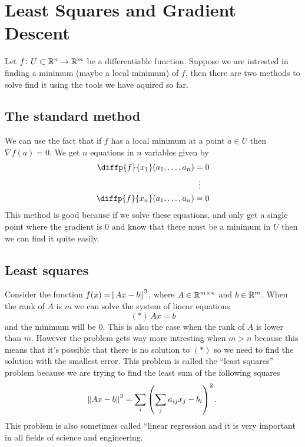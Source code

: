 \documentclass[11pt,a4paper]{article}
\begin{document}
\newpage

\section{Least Squares and Gradient Descent}
Let $f \colon U \subset \mathbb{R}^n \to \mathbb{R}^m$ be a differentiable function.
Suppose we are intrested in finding a minimum (maybe a local minimum) of $f$,
then there are two methods to solve find it using the tools we have aquired
so far.

\subsection{The standard method}
We can use the fact that if $f$ has a local minimum at a point $a \in U$ then
$\nabla f(a) = 0$.
We get $n$ equations in $n$ variables given by
\begin{align*}
  \diffp{f}{{x_1}}(a_1,\dots,a_n) &= 0 \\
                                  &\vdotswithin{=} \\
  \diffp{f}{{x_n}}(a_1,\dots,a_n) &= 0
\end{align*}
This method is good because if we solve these equations, and only get a single
point where the gradient is $0$ and know that there must be a minimum in $U$
then we can find it quite easily.

\subsection{Least squares}
Consider the function $f(x) = \norm{Ax - b}^2$, where $A \in \mathbb{R}^{m \times n}$
and $b \in \mathbb{R}^m$.
When the rank of $A$ is $m$ we can solve the system of linear equations
\[
  (*)\,Ax = b
\]
and the minimum will be $0$.
This is also the case when the rank of $A$ is lower than $m$.
However the problem gets way more intresting when $m > n$ because this means
that it's possible that there is no solution to $(*)$ so we need to find
the solution with the smallest error.
This problem is called the ``least squares'' problem because we are trying
to find the least sum of the following squares
\[
  \norm{Ax - b}^2 = \sum_{i}\del{\sum_{j} a_{ij} x_{j} - b_{i}}^2.
\]
This problem is also sometimes called ``linear regression and it is very
important in all fields of science and engineering.
\end{document}
